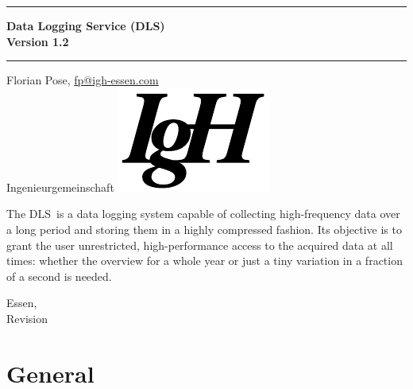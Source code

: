 \documentclass[a4paper,12pt,BCOR6mm,bibtotoc,idxtotoc]{scrbook}
\newcommand{\IgH}{\raisebox{-0.7667ex} {\includegraphics[height=2.2ex]{bilder/ighsign}}}
\begin{document}


 \pagestyle{empty}

\begin{titlepage} \begin{center} \rule{\textwidth}{1.5mm}

{\Huge\bf Data Logging Service (DLS)\\[1ex] Version 1.2}

\vspace{1ex}

\rule{\textwidth}{1.5mm}

\vspace{\fill}

{\Large Florian Pose, \url{fp@igh-essen.com}\\[1ex] Ingenieurgemeinschaft \IgH}

\vspace{\fill}

The \glqq DLS\grqq\ is a data logging system capable of collecting high-frequency data over a long period and storing them in a highly compressed fashion. Its objective is to grant the user unrestricted, high-performance access to the acquired data at all times: whether the overview for a whole year or just a tiny variation in a fraction of a second is needed.

\vspace{\fill}

{\large Essen, \rcsInfoLongDate\\[1ex] Revision \rcsInfoRevision} \end{center} \end{titlepage}



\pagestyle{scrheadings}

\tableofcontents



\chapter{General} \label{sec:allg} 

\end{document}
